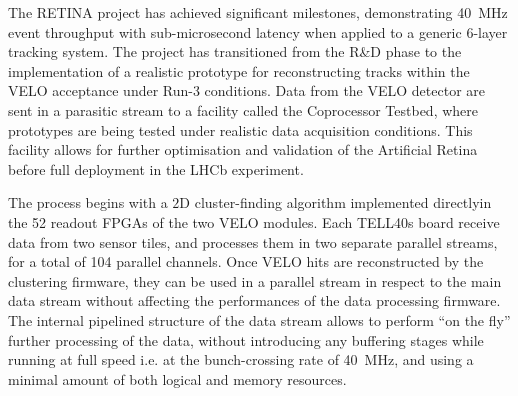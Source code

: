 The RETINA project has achieved significant milestones, demonstrating \SI{40}{\mega\hertz} event throughput with sub-microsecond latency when applied to a generic 6-layer tracking system\cite{Abba_2015}. The project has transitioned from the R\&D phase to the implementation of a realistic prototype for reconstructing tracks within the VELO acceptance under Run-3 conditions. Data from the VELO detector are sent in a parasitic stream to a facility called the Coprocessor Testbed, where  prototypes are being tested under realistic data acquisition conditions. This facility allows for further optimisation and validation of the Artificial Retina before full deployment in the LHCb experiment.

The process begins with a $2$D cluster-finding algorithm implemented directlyin the 52 readout FPGAs of the two VELO modules. Each TELL40s board receive data from two sensor tiles, and processes them in two separate parallel streams, for a total of 104 parallel channels. Once VELO hits are reconstructed by the clustering firmware, they can be used in a parallel stream in respect to the main data stream without affecting the performances of the data processing firmware. The internal pipelined structure of the data stream allows to perform ``on the fly” further processing of the data, without introducing any buffering stages while running at full speed i.e. at the bunch-crossing rate of \SI{40}{\mega\hertz}, and using a minimal amount of both logical and memory resources.





